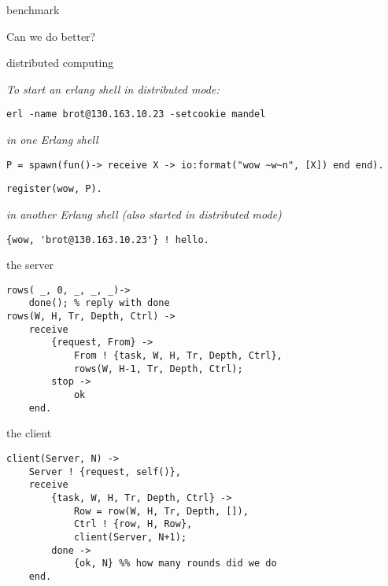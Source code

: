\begin{frame}{benchmark}

Can we do better?

\end{frame}

\begin{frame}[fragile]{distributed computing}

{\em To start an erlang shell in distributed mode:}

\begin{verbatim}
erl -name brot@130.163.10.23 -setcookie mandel
\end{verbatim}
\pause\vspace{10pt}

{\em in one Erlang shell}

\begin{verbatim}
P = spawn(fun()-> receive X -> io:format("wow ~w~n", [X]) end end).
\end{verbatim}
\pause
\begin{verbatim}
register(wow, P).
\end{verbatim}

\pause\vspace{10pt}

{\em in another Erlang shell (also started in distributed mode)}

\begin{verbatim}
{wow, 'brot@130.163.10.23'} ! hello.
\end{verbatim}


\end{frame}

\begin{frame}[fragile]{the server}

\begin{verbatim}
rows( _, 0, _, _, _)->
    done(); % reply with done
rows(W, H, Tr, Depth, Ctrl) ->
    receive 
        {request, From} ->
            From ! {task, W, H, Tr, Depth, Ctrl},
            rows(W, H-1, Tr, Depth, Ctrl);
        stop ->
            ok
    end.
\end{verbatim}


\end{frame}

\begin{frame}[fragile]{the client}

\begin{verbatim}
client(Server, N) ->
    Server ! {request, self()},
    receive
        {task, W, H, Tr, Depth, Ctrl} ->
            Row = row(W, H, Tr, Depth, []),
            Ctrl ! {row, H, Row},
            client(Server, N+1);
        done ->
            {ok, N} %% how many rounds did we do
    end.
\end{verbatim}

\end{frame}

